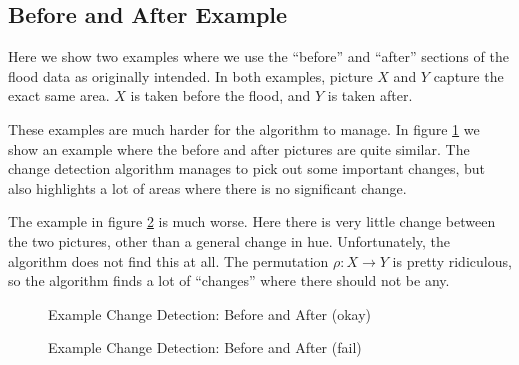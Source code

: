 \documentclass[12pt]{article}
\begin{document}
\subsection{Before and After Example}

Here we show two examples where we use the ``before'' and ``after'' sections of the flood data as originally intended. In both examples, picture $X$ and $Y$ capture the exact same area. $X$ is taken before the flood, and $Y$ is taken after.

These examples are much harder for the algorithm to manage. In figure \ref{fig:beforeafterokay} we show an example where the before and after pictures are quite similar. The change detection algorithm manages to pick out some important changes, but also highlights a lot of areas where there is no significant change.

The example in figure \ref{fig:beforeafterfail} is much worse. Here there is very little change between the two pictures, other than a general change in hue. Unfortunately, the algorithm does not find this at all. The permutation $\rho: X\to Y$ is pretty ridiculous, so the algorithm finds a lot of ``changes'' where there should not be any.

\begin{figure}
  \caption{Example Change Detection: Before and After (okay)}
  \label{fig:beforeafterokay}
\end{figure}

\begin{figure}
  \caption{Example Change Detection: Before and After (fail)}
  \label{fig:beforeafterfail}
\end{figure}
\end{document}
